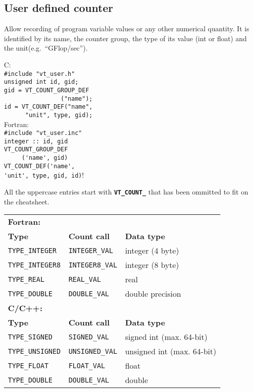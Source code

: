 \begin{multicols}{3}
\subsection{User defined counter}
Allow recording of program variable values or any other numerical quantity.
It is identified by its name, the counter group, the type of its value (int or float) and the unit(e.g.~``GFlop/sec'').
\begin{multicols}{2}
C:\\
\verb!#include "vt_user.h"!\\
\verb!unsigned int id, gid;!\\
\verb!gid = VT_COUNT_GROUP_DEF!\\
\verb!                ("name");!\\
\verb!id = VT_COUNT_DEF("name",!\\
\verb!      "unit", type, gid);!\\

Fortran:\\
\verb!#include "vt_user.inc"!\\
\verb!integer :: id, gid!\\
\verb!VT_COUNT_GROUP_DEF!\\
\verb!     ('name', gid)!\\
\verb!VT_COUNT_DEF('name',!\\
\verb!'unit', type, gid, id)!!\\
\end{multicols}

All the uppercase entries start with \texttt{\textbf{VT\_COUNT\_}} that has been ommitted to fit on the cheatsheet.
\begin{tabular}{@{}l@{ }l@{ }l@{}}
\textbf{Fortran:} \\
\textbf{Type} & \textbf{Count call} & \textbf{Data type} \\ 
\texttt{TYPE\_INTEGER} &
	\texttt{INTEGER\_VAL} &
	integer (4 byte) \\
\texttt{TYPE\_INTEGER8} &
	\texttt{INTEGER8\_VAL} &
	integer (8 byte) \\
\texttt{TYPE\_REAL} &
	\texttt{REAL\_VAL} &
	real \\
\texttt{TYPE\_DOUBLE} &
	\texttt{DOUBLE\_VAL} &
	double precision \\

\textbf{C/C++:} \\
\textbf{Type} & \textbf{Count call} & \textbf{Data type} \\ 
\texttt{TYPE\_SIGNED} &
	\texttt{SIGNED\_VAL} &
	signed int (max. 64-bit) \\
\texttt{TYPE\_UNSIGNED} &
	\texttt{UNSIGNED\_VAL} &
	unsigned int (max. 64-bit) \\
\texttt{TYPE\_FLOAT} &
	\texttt{FLOAT\_VAL} &
	float \\
\texttt{TYPE\_DOUBLE} &
	\texttt{DOUBLE\_VAL} &
	double \\
\end{tabular}


\end{multicols}
